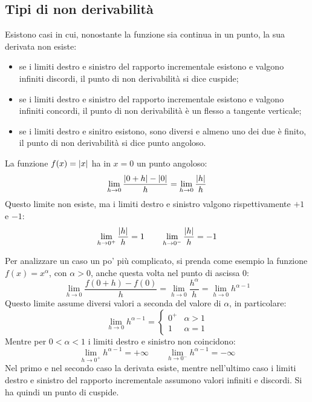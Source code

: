 \subsection{Tipi di non derivabilità}
Esistono casi in cui, nonostante la funzione sia continua in un punto, la sua derivata non esiste:
\begin{itemize}
	\item se i limiti destro e sinistro del rapporto incrementale esistono e valgono infiniti discordi, il punto di non derivabilità si dice cuspide;
	\item se i limiti destro e sinistro del rapporto incrementale esistono e valgono infiniti concordi, il punto di non derivabilità è un flesso a tangente verticale;
	\item se i limiti destro e sinitro esistono, sono diversi e almeno uno dei due è finito, il punto di non derivabilità si dice punto angoloso.
\end{itemize}
\begin{examp}
	La funzione $f(x)=\left\lvert x \right\rvert$ ha in $x=0$ un punto angoloso:
	\[
		\lim_{h\to 0} \frac{\left\lvert 0+h \right\rvert-\left\lvert 0 \right\rvert}{h} = \lim_{h\to 0} \frac{\left\lvert h \right\rvert}{h}
	\]
	Questo limite non esiste, ma i limiti destro e sinistro valgono rispettivamente $+1$ e $-1$:
	\[
		\lim_{h\to 0^+} \frac{\left\lvert h \right\rvert}{h}=1\qquad\lim_{h\to 0^-} \frac{\left\lvert h \right\rvert}{h}=-1
	\]
\end{examp}

\begin{examp}
	Per analizzare un caso un po' più complicato, si prenda come esempio la funzione $f(x)=x^\alpha$, con $\alpha>0$, anche questa volta nel punto di ascissa $0$:
	\[
		\lim_{h\to0} \frac{f(0+h)-f(0)}{h} = \lim_{h\to0} \frac{h^\alpha}{h}=\lim_{h\to0} h^{\alpha-1}
	\]
	Questo limite assume diversi valori a seconda del valore di $\alpha$, in particolare:
	\[
		\lim_{h\to0} h^{\alpha-1}=
		\begin{cases}
			0^+ & \alpha>1 \\
			1   & \alpha=1
		\end{cases}
	\]
	Mentre per $0<\alpha<1$ i limiti destro e sinistro non coincidono:
	\[
		\lim_{h\to0^+} h^{\alpha-1}=+\infty\qquad\lim_{h\to0^-} h^{\alpha-1}=-\infty
	\]
	Nel primo e nel secondo caso la derivata esiste, mentre nell'ultimo caso i limiti destro e sinistro del rapporto incrementale assumono valori infiniti e discordi. Si ha quindi un punto di cuspide.
\end{examp}
